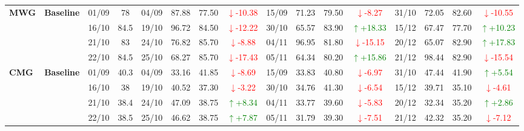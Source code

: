 {\begin{longtable}{llcc|cccc|cccc|cccc}
\multirow{4}{*}{\textbf{MWG}}
& \textbf{Baseline}
& 01/09 & 78 & 04/09 & 87.88 & 77.50 & \textcolor{red}{\(\downarrow\)-10.38} & 15/09 & 71.23 & 79.50 & \textcolor{red}{\(\downarrow\)-8.27} & 31/10 & 72.05 & 82.60 & \textcolor{red}{\(\downarrow\)-10.55} \\
& & 16/10 & 84.5 & 19/10 & 96.72 & 84.50 & \textcolor{red}{\(\downarrow\)-12.22} & 30/10 & 65.57 & 83.90 & \textcolor{green}{\(\uparrow\)+18.33} & 15/12 & 67.47 & 77.70 & \textcolor{green}{\(\uparrow\)+10.23} \\
& & 21/10 & 83 & 24/10 & 76.82 & 85.70 & \textcolor{red}{\(\downarrow\)-8.88} & 04/11 & 96.95 & 81.80 & \textcolor{red}{\(\downarrow\)-15.15} & 20/12 & 65.07 & 82.90 & \textcolor{green}{\(\uparrow\)+17.83} \\
& & 22/10 & 84.5 & 25/10 & 68.27 & 85.70 & \textcolor{red}{\(\downarrow\)-17.43} & 05/11 & 64.34 & 80.20 & \textcolor{green}{\(\uparrow\)+15.86} & 21/12 & 98.44 & 82.90 & \textcolor{red}{\(\downarrow\)-15.54} \\
\midrule

\multirow{4}{*}{\textbf{CMG}}
& \textbf{Baseline}
& 01/09 & 40.3 & 04/09 & 33.16 & 41.85 & \textcolor{red}{\(\downarrow\)-8.69} & 15/09 & 33.83 & 40.80 & \textcolor{red}{\(\downarrow\)-6.97} & 31/10 & 47.44 & 41.90 & \textcolor{green}{\(\uparrow\)+5.54} \\
& & 16/10 & 38 & 19/10 & 40.52 & 37.30 & \textcolor{red}{\(\downarrow\)-3.22} & 30/10 & 34.76 & 41.30 & \textcolor{red}{\(\downarrow\)-6.54} & 15/12 & 39.71 & 35.10 & \textcolor{red}{\(\downarrow\)-4.61} \\
& & 21/10 & 38.4 & 24/10 & 47.09 & 38.75 & \textcolor{green}{\(\uparrow\)+8.34} & 04/11 & 33.77 & 39.60 & \textcolor{red}{\(\downarrow\)-5.83} & 20/12 & 32.34 & 35.20 & \textcolor{green}{\(\uparrow\)+2.86} \\
& & 22/10 & 38.5 & 25/10 & 46.62 & 38.75 & \textcolor{green}{\(\uparrow\)+7.87} & 05/11 & 31.79 & 39.30 & \textcolor{red}{\(\downarrow\)-7.51} & 21/12 & 42.32 & 35.20 & \textcolor{red}{\(\downarrow\)-7.12} \\
\midrule


\end{longtable}}
